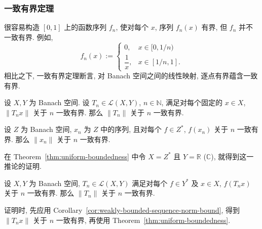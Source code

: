 \subsubsection{一致有界定理}\label{subsec:uniform-boundedness-theorem}

很容易构造 $[0,1]$ 上的函数序列 $f_n$, 使对每个 $x$, 序列 $f_n(x)$ 有界, 但 $f_n$ 并不一致有界. 例如,
\begin{equation}\label{eq:pointwise-bounded-not-uniform-function-sequence}
f_n(x):=\begin{cases}0,&x\in[0,1/n)\\\dfrac{1}{x},&x\in[1/n,1].\end{cases}
\end{equation}
相比之下, 一致有界定理断言, 对 Banach 空间之间的线性映射, 逐点有界蕴含一致有界.

\begin{Theorem}
\label{thm:uniform-boundedness}
设 $X,Y$ 为 Banach 空间. 设 $T_n\in\mathcal{L}(X,Y)$, $n\in\mathbb{N}$, 满足对每个固定的 $x\in X$, $\|T_nx\|$ 关于 $n$ 一致有界. 那么 $\|T_n\|$ 关于 $n$ 一致有界.
\end{Theorem}

\begin{Corollary}
\label{cor:weakly-bounded-sequence-norm-bound}
设 $Z$ 为 Banach 空间, $x_n$ 为 $Z$ 中的序列, 且对每个 $f\in Z^*$, $f(x_n)$ 关于 $n$ 一致有界. 那么 $\|x_n\|$ 关于 $n$ 一致有界.
\end{Corollary}

在 Theorem~\ref{thm:uniform-boundedness} 中令 $X=Z^*$ 且 $Y=\mathbb{R}$ ($\mathbb{C}$), 就得到这一推论的证明.

\begin{Corollary}
\label{cor:weak-operator-bounds-imply-uniform-bound}
设 $X,Y$ 为 Banach 空间, $T_n\in\mathcal{L}(X,Y)$ 满足对每个 $f\in Y^*$ 及 $x\in X$, $f(T_nx)$ 关于 $n$ 一致有界. 那么 $\|T_n\|$ 关于 $n$ 一致有界.
\end{Corollary}

证明时, 先应用 Corollary~\ref{cor:weakly-bounded-sequence-norm-bound}, 得到 $\|T_nx\|$ 关于 $n$ 一致有界, 再使用 Theorem~\ref{thm:uniform-boundedness}.

